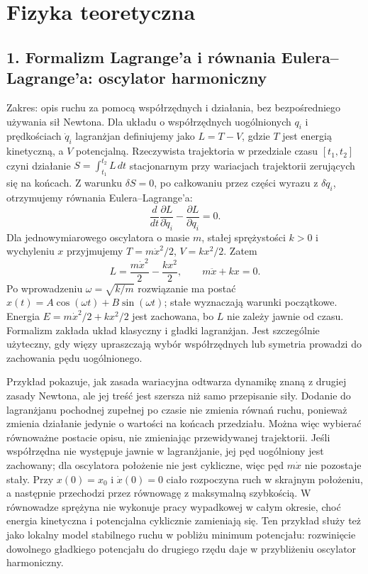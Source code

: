 \documentclass[11pt,a4paper]{article}
\begin{document}
\clearpage
\section{Fizyka teoretyczna}
\subsection{1. Formalizm Lagrange’a i równania Eulera--Lagrange’a: oscylator harmoniczny}
Zakres: opis ruchu za pomocą współrzędnych i działania, bez bezpośredniego używania sił Newtona. Dla układu o współrzędnych uogólnionych \(q_i\) i prędkościach \(\dot q_i\) lagranżjan definiujemy jako \(L=T-V\), gdzie \(T\) jest energią kinetyczną, a \(V\) potencjalną. Rzeczywista trajektoria w przedziale czasu \([t_1,t_2]\) czyni działanie \(S=\int_{t_1}^{t_2}L\,dt\) stacjonarnym przy wariacjach trajektorii zerujących się na końcach. Z warunku \(\delta S=0\), po całkowaniu przez części wyrazu z \(\delta\dot q_i\), otrzymujemy równania Eulera--Lagrange’a:
\[
\frac{d}{dt}\frac{\partial L}{\partial \dot q_i}-\frac{\partial L}{\partial q_i}=0.
\]
Dla jednowymiarowego oscylatora o masie \(m\), stałej sprężystości \(k>0\) i wychyleniu \(x\) przyjmujemy \(T=m\dot x^2/2\), \(V=kx^2/2\). Zatem
\[
L=\frac{m\dot x^2}{2}-\frac{kx^2}{2},\qquad m\ddot x+kx=0.
\]
Po wprowadzeniu \(\omega=\sqrt{k/m}\) rozwiązanie ma postać \(x(t)=A\cos(\omega t)+B\sin(\omega t)\); stałe wyznaczają warunki początkowe. Energia \(E=m\dot x^2/2+kx^2/2\) jest zachowana, bo \(L\) nie zależy jawnie od czasu. Formalizm zakłada układ klasyczny i gładki lagranżjan. Jest szczególnie użyteczny, gdy więzy upraszczają wybór współrzędnych lub symetria prowadzi do zachowania pędu uogólnionego.

Przykład pokazuje, jak zasada wariacyjna odtwarza dynamikę znaną z drugiej zasady Newtona, ale jej treść jest szersza niż samo przepisanie siły. Dodanie do lagranżjanu pochodnej zupełnej po czasie nie zmienia równań ruchu, ponieważ zmienia działanie jedynie o wartości na końcach przedziału. Można więc wybierać równoważne postacie opisu, nie zmieniając przewidywanej trajektorii. Jeśli współrzędna nie występuje jawnie w lagranżjanie, jej pęd uogólniony jest zachowany; dla oscylatora położenie nie jest cykliczne, więc pęd \(m\dot x\) nie pozostaje stały. Przy \(x(0)=x_0\) i \(\dot x(0)=0\) ciało rozpoczyna ruch w skrajnym położeniu, a następnie przechodzi przez równowagę z maksymalną szybkością. W równowadze sprężyna nie wykonuje pracy wypadkowej w całym okresie, choć energia kinetyczna i potencjalna cyklicznie zamieniają się. Ten przykład służy też jako lokalny model stabilnego ruchu w pobliżu minimum potencjału: rozwinięcie dowolnego gładkiego potencjału do drugiego rzędu daje w przybliżeniu oscylator harmoniczny.
\end{document}

